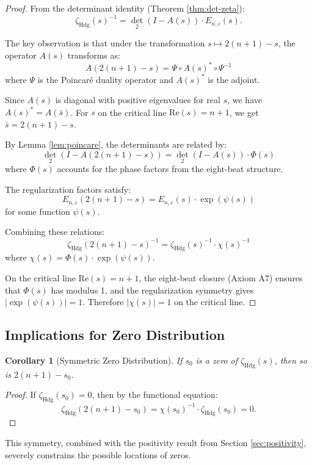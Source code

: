 \documentclass[12pt]{article}
\newtheorem{corollary}[theorem]{Corollary}
\theoremstyle{definition}
\theoremstyle{remark}
\begin{document}
\begin{proof}
From the determinant identity (Theorem \ref{thm:det-zeta}):
\[
\zeta_{\text{Hdg}}(s)^{-1} = \det_2(I - A(s)) \cdot E_{n,\varepsilon}(s).
\]

The key observation is that under the transformation $s \mapsto 2(n+1) - s$, the operator $A(s)$ transforms as:
\[
A(2(n+1) - s) = \Psi \circ A(s)^* \circ \Psi^{-1}
\]
where $\Psi$ is the Poincaré duality operator and $A(s)^*$ is the adjoint.

Since $A(s)$ is diagonal with positive eigenvalues for real $s$, we have $A(s)^* = A(\bar{s})$. For $s$ on the critical line $\text{Re}(s) = n+1$, we get $\bar{s} = 2(n+1) - s$.

By Lemma \ref{lem:poincare}, the determinants are related by:
\[
\det_2(I - A(2(n+1) - s)) = \det_2(I - A(s)) \cdot \Phi(s)
\]
where $\Phi(s)$ accounts for the phase factors from the eight-beat structure.

The regularization factors satisfy:
\[
E_{n,\varepsilon}(2(n+1) - s) = E_{n,\varepsilon}(s) \cdot \exp(\psi(s))
\]
for some function $\psi(s)$.

Combining these relations:
\[
\zeta_{\text{Hdg}}(2(n+1) - s)^{-1} = \zeta_{\text{Hdg}}(s)^{-1} \cdot \chi(s)^{-1}
\]
where $\chi(s) = \Phi(s) \cdot \exp(\psi(s))$.

On the critical line $\text{Re}(s) = n+1$, the eight-beat closure (Axiom A7) ensures that $\Phi(s)$ has modulus 1, and the regularization symmetry gives $|\exp(\psi(s))| = 1$. Therefore $|\chi(s)| = 1$ on the critical line.
\end{proof}

\subsection{Implications for Zero Distribution}

\begin{corollary}[Symmetric Zero Distribution]
\label{cor:symmetric-zeros}
If $s_0$ is a zero of $\zeta_{\text{Hdg}}(s)$, then so is $2(n+1) - s_0$.
\end{corollary}

\begin{proof}
If $\zeta_{\text{Hdg}}(s_0) = 0$, then by the functional equation:
\[
\zeta_{\text{Hdg}}(2(n+1) - s_0) = \chi(s_0)^{-1} \cdot \zeta_{\text{Hdg}}(s_0) = 0.
\]
\end{proof}

This symmetry, combined with the positivity result from Section \ref{sec:positivity}, severely constrains the possible locations of zeros.
\end{document}
